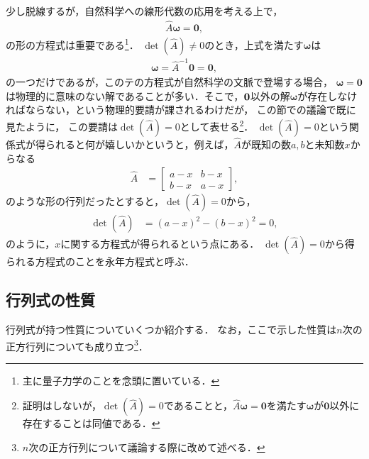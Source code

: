 少し脱線するが，自然科学への線形代数の応用を考える上で，
\begin{align}
 \hat{A}\bm{\omega} = \bm{0},
\end{align}
の形の方程式は重要である\footnote{主に量子力学のことを念頭に置いている．}．
$\det(\hat{A})\neq 0$のとき，上式を満たす$\bm{\omega}$は
\begin{align}
 \bm{\omega} = \hat{A}^{-1}\bm{0} = \bm{0}, 
\end{align}
の一つだけであるが，このテの方程式が自然科学の文脈で登場する場合，
$\bm{\omega}=\bm{0}$は物理的に意味のない解であることが多い．そこで，${\bf 0}$以外の解$\bm{\omega}$が存在しなければならない，という物理的要請が課されるわけだが，
この節での議論で既に見たように，
この要請は$\det(\hat{A}) = 0$として表せる\footnote{証明はしないが，$\det(\hat{A})=0$であることと，$\hat{A}\bm{\omega}=\bm{0}$を満たす$\bm{\omega}$が${\bm 0}$以外に存在することは同値である．}．
$\det(\hat{A})=0$という関係式が得られると何が嬉しいかというと，例えば，$\hat{A}$が既知の数$a,b$と未知数$x$からなる
\begin{align}
\hat{A} & =\left[\begin{array}{cc}
a-x & b-x\\
b-x & a-x
\end{array}\right], 
\end{align}
のような形の行列だったとすると，$\det(\hat{A})=0$から，
\begin{align}
 \det(\hat{A}) & =\left(a-x\right)^{2}-\left(b-x\right)^{2}=0,
\end{align}
のように，$x$に関する方程式が得られるという点にある．
$\det(\hat{A})=0$から得られる方程式のことを永年方程式と呼ぶ．
%
\subsection{行列式の性質}
%
行列式が持つ性質についていくつか紹介する．
なお，ここで示した性質は$n$次の正方行列についても成り立つ\footnote{$n$次の正方行列について議論する際に改めて述べる．}．
%
